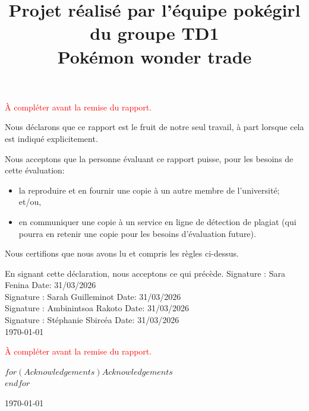 \documentclass[mstat,12pt]{unswthesis}
\title{Projet réalisé par l'équipe pokégirl du groupe TD1\\[3cm]Pokémon wonder trade}
\author{\Authornameonly}
\begin{document}
\beforepreface




\textcolor{red}{À compléter avant la remise du rapport.}

\vskip 2pc \noindent Nous déclarons que ce rapport est le fruit de notre seul travail, à part lorsque cela est indiqué  explicitement. 

\vskip 2pc  \noindent Nous acceptons que la personne évaluant ce rapport puisse, pour les besoins de cette évaluation:
\begin{itemize}
\item la reproduire et en fournir une copie à un autre membre de l'université; et/ou,
\item en communiquer une copie à un service en ligne de détection de plagiat (qui pourra en retenir une copie pour les besoins d'évaluation future).
\end{itemize}

\vskip 2pc \noindent Nous certifions que nous avons lu et compris les règles ci-dessus.\vspace{24pt}

\vskip 2pc \noindent En signant cette déclaration, nous acceptons ce qui précède.
\vskip 2pc \noindent
Signature : Sara Fenina \hfill Date: 31/03/2026\\[1cm]
Signature : Sarah Guilleminot \hfill Date: 31/03/2026\\[1cm]
Signature : Ambinintsoa Rakoto \hfill Date: 31/03/2026\\[1cm]
Signature : Stéphanie Sbircéa \hfill Date: 31/03/2026\\[1cm]

{\bigskip\bigskip\bigskip\noindent} \today




\textcolor{red}{À compléter avant la remise du rapport.}

{\bigskip}$for(Acknowledgements)$$Acknowledgements$\\[1cm] $endfor$

{\bigskip\bigskip\bigskip\noindent} \today
\end{document}
